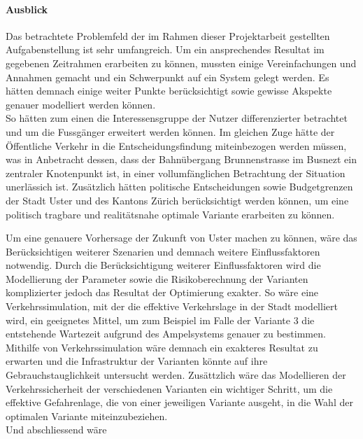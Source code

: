 \paragraph{Ausblick}

Das betrachtete Problemfeld der im Rahmen dieser Projektarbeit gestellten Aufgabenstellung ist sehr umfangreich. Um ein ansprechendes Resultat im gegebenen Zeitrahmen erarbeiten zu können, mussten einige Vereinfachungen und Annahmen gemacht und ein Schwerpunkt auf ein System gelegt werden. Es hätten demnach einige weiter Punkte berücksichtigt sowie gewisse Akspekte genauer modelliert werden können. \\
So hätten zum einen die Interessensgruppe der Nutzer differenzierter betrachtet und um die Fussgänger erweitert werden können. Im gleichen Zuge hätte der Öffentliche Verkehr in die Entscheidungsfindung miteinbezogen werden müssen, was in Anbetracht dessen, dass der Bahnübergang Brunnenstrasse im Busnezt ein zentraler Knotenpunkt ist, in einer vollumfänglichen Betrachtung der Situation unerlässich ist. Zusätzlich hätten politische Entscheidungen sowie Budgetgrenzen der Stadt Uster und des Kantons Zürich berücksichtigt werden können, um eine politisch tragbare und realitätsnahe optimale Variante erarbeiten zu können.

Um eine genauere Vorhersage der Zukunft von Uster machen zu können, wäre das Berücksichtigen weiterer Szenarien und demnach weitere Einflussfaktoren notwendig. Durch die Berücksichtigung weiterer Einflussfaktoren wird die Modellierung der Parameter sowie die Risikoberechnung der Varianten komplizierter jedoch das Resultat der Optimierung exakter. 
So wäre eine Verkehrssimulation, mit der die effektive Verkehrslage in der Stadt modelliert wird, ein geeignetes Mittel, um zum Beispiel im Falle der Variante 3 die entstehende Wartezeit aufgrund des Ampelsystems genauer zu bestimmen. Mithilfe von Verkehrssimulation wäre demnach ein exakteres Resultat zu erwarten und die Infrastruktur der Varianten könnte auf ihre Gebrauchstauglichkeit untersucht werden. Zusättzlich wäre das Modellieren der Verkehrssicherheit der verschiedenen Varianten ein wichtiger Schritt, um die effektive Gefahrenlage, die von einer jeweiligen Variante ausgeht, in die Wahl der optimalen Variante miteinzubeziehen.\\
Und abschliessend wäre 
  



%


